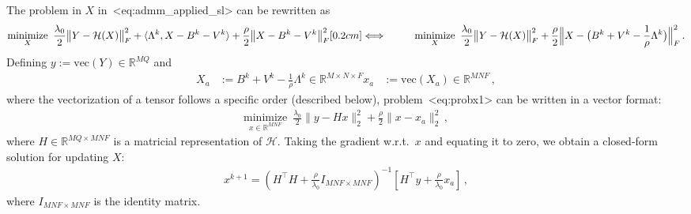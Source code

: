 \documentclass[a4paper,11pt]{article}
\def\\{}%
\def\eqref#1{<#1>}%
\newcommand{\mypar}[1]{\bigskip\noindent {\bf #1.}}
\begin{document}
\mypar{Updating $\bm{X}$}
The problem in $X$ in~\eqref{eq:admm_applied_sl} can be rewritten as
\begin{align}
	                          &
	\underset{X}{\text{minimize}}\,\,\,
	\frac{\lambda_0}{2}
	\big\|Y - \mathcal{H}(X)\big\|_F^2
	+
	\langle\Lambda^k, X - B^{k} - V^{k}\rangle
	+
	\frac{\rho}{2}
	\big\|X - B^k - V^k\big\|_{F}^2
	\notag
	\\[0.2cm]
	\Longleftrightarrow\qquad &
	\underset{X}{\text{minimize}}\,\,\,
	\frac{\lambda_0}{2}
	\big\|Y - \mathcal{H}(X) \big\|_F^2
	+
	\frac{\rho}{2}
	\Big\| X - \big(B^k + V^k - \frac{1}{\rho}\Lambda^k\big) \Big\|_F^2\,.
	\label{eq:probx1}
\end{align}
Defining $y := \text{vec}(Y) \in \mathbb{R}^{MQ}$ and
\begin{align*}
	X_a & := B^k + V^k - \frac{1}{\rho}\Lambda^k \in \mathbb{R}^{M \times N \times F}
	\\
	x_a & := \text{vec}(X_a) \in \mathbb{R}^{MNF}\,,
\end{align*}
where the vectorization of a tensor follows a specific order (described below),
problem~\eqref{eq:probx1} can be written in a vector format:
\begin{align*}
	\underset{x \in \mathbb{R}^{MNF}}{\text{minimize}}\,\,\,
	\frac{\lambda_0}{2}
	\|y - Hx\|_2^2
	+
	\frac{\rho}{2}
	\| x - x_a\|_2^2\,,
\end{align*}
where $H \in \mathbb{R}^{MQ \times MNF}$ is a matricial representation of
$\mathcal{H}$. Taking the gradient w.r.t.\ $x$ and equating it to zero, we
obtain a closed-form solution for updating $X$:
\begin{align}
	x^{k+1}
	=
	\left(H^\top H + \frac{\rho}{\lambda_0} I_{MNF \times MNF}\right)^{-1}
	\left[H^\top y + \frac{\rho}{\lambda_0} x_a\right]\,,
	\label{eq:probxclosedformvec}
\end{align}
where $I_{MNF \times MNF}$ is the identity matrix.
\end{document}
